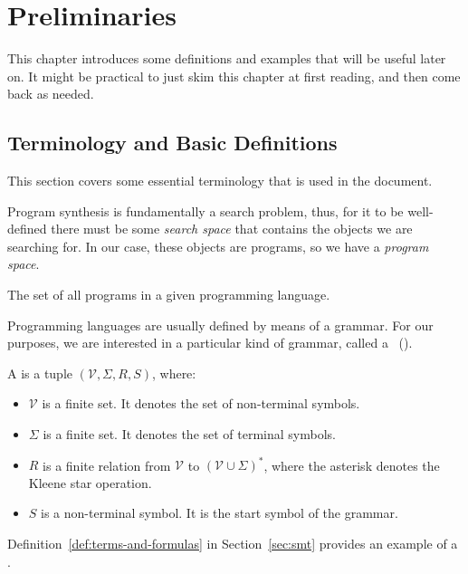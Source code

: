 \chapter{Preliminaries}
\label{chapter:preliminaries}

This chapter introduces some definitions and examples that will be useful later
on. It might be practical to just skim this chapter at first reading, and then
come back as needed.

\section{Terminology and Basic Definitions}
\label{sec:terminology}

This section covers some essential terminology that is used in the document.

Program synthesis is fundamentally a search problem, thus, for it to be
well-defined there must be some \textit{search space} that contains the objects
we are searching for.
In our case, these objects are programs, so we have a \textit{program space}.

\begin{definition}
  The set of all programs in a given programming language.
\end{definition}

Programming languages are usually defined by means of a grammar.
For our purposes, we are interested in a particular kind of grammar, called a
~().

\begin{definition}
  A  is a tuple $(\mathcal{V}, \Sigma{}, R, S)$, where:
  \begin{itemize}
  \item $\mathcal{V}$ is a finite set. It denotes the set of non-terminal symbols.
  \item $\Sigma{}$ is a finite set. It denotes the set of terminal symbols.
  \item $R$ is a finite relation from $\mathcal{V}$ to $(\mathcal{V} \cup
    \Sigma{})^*$, where the asterisk denotes the Kleene star operation.
  \item $S$ is a non-terminal symbol. It is the start symbol of the grammar.
  \end{itemize}
\end{definition}

Definition~\ref{def:terms-and-formulas} in Section~\ref{sec:smt} provides an
example of a .

